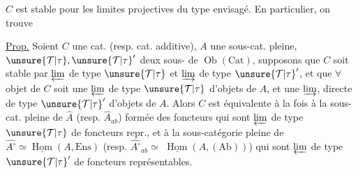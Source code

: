 $C$ est stable pour les limites projectives
du type envisagé.
En particulier, on trouve

\uline{Prop.} Soient $C$ une cat. (resp. cat.
additive), $A$ une sous-cat. pleine,
$\unsure{\mathcal{T}|\tau},\unsure{\mathcal{T}|\tau}'$ deux sous-
de $\operatorname{Ob}(\mathrm{Cat})$, supposons que $C$ soit
stable par $\varprojlim$ de type $\unsure{\mathcal{T}|\tau}$ et $\varinjlim$
de type $\unsure{\mathcal{T}|\tau}'$, et que $\forall$ objet de
$C$ soit une $\varprojlim$  de type $\unsure{\mathcal{T}|\tau}$ d'objets
de $A$, et une $\varinjlim$, directe de type $\unsure{\mathcal{T}|\tau}'$
d'objets de $A$. Alors $C$ est équivalente
à la fois à la sous-cat. pleine
de $\widehat A$ (resp. $\widehat A_{ab}$)  formée des
foncteurs 
qui sont $\varprojlim$ 
de type $\unsure{\mathcal{T}|\tau}$ de foncteurs repr.,
et à la  sous-catégorie pleine de
$\widehat{A^\circ}\simeq\underline{\operatorname{Hom}}(A,\mathrm{Ens})$
(resp. $\widehat{A^\circ}_{ab}\simeq$
$\underline{\operatorname{Hom}}(A,(\mathrm{Ab}))$) qui sont
$\varprojlim$ de type $\unsure{\mathcal{T}|\tau}'$ de foncteurs
représentables.
